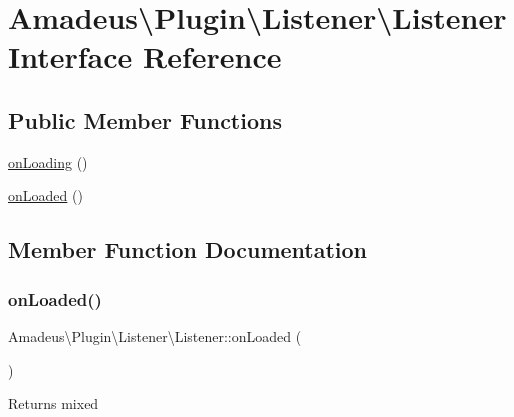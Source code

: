 \hypertarget{interfaceAmadeus_1_1Plugin_1_1Listener_1_1Listener}{}\section{Amadeus\textbackslash{}Plugin\textbackslash{}Listener\textbackslash{}Listener Interface Reference}
\label{interfaceAmadeus_1_1Plugin_1_1Listener_1_1Listener}
\subsection*{Public Member Functions}
\begin{DoxyCompactItemize}
\item 
\hyperlink{interfaceAmadeus_1_1Plugin_1_1Listener_1_1Listener_ad97885a35170528fea1748f62fc364ff}{on\+Loading} ()
\item 
\hyperlink{interfaceAmadeus_1_1Plugin_1_1Listener_1_1Listener_a0911f5c1f902c2cbc005c4eb6ab99206}{on\+Loaded} ()
\end{DoxyCompactItemize}


\subsection{Member Function Documentation}
\mbox{\label{interfaceAmadeus_1_1Plugin_1_1Listener_1_1Listener_a0911f5c1f902c2cbc005c4eb6ab99206}} 
\subsubsection{\texorpdfstring{on\+Loaded()}{onLoaded()}}
{\footnotesize\ttfamily Amadeus\textbackslash{}\+Plugin\textbackslash{}\+Listener\textbackslash{}\+Listener\+::on\+Loaded (\begin{DoxyParamCaption}{ }\end{DoxyParamCaption})}

\begin{DoxyReturn}{Returns}
mixed 
\end{DoxyReturn}
\mbox{\label{interfaceAmadeus_1_1Plugin_1_1Listener_1_1Listener_ad97885a35170528fea1748f62fc364ff}} 
